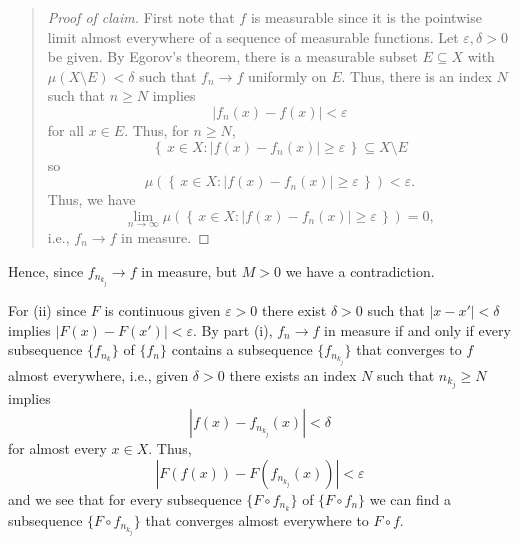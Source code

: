 \begin{solution}
\begin{quote}
\begin{proof}[Proof of claim]
    First note that $f$ is measurable since it is the pointwise limit
    almost everywhere of a sequence of measurable functions. Let
    $\varepsilon,\delta>0$ be given.  By Egorov's theorem,
    there is a measurable subset $E\subseteq X$ with
    $\mu(X\setminus E)<\delta$ such that $f_n\to f$ uniformly on $E$. Thus,
    there is an index $N$ such that $n\geq N$ implies
    \[
      |f_n(x)-f(x)|<\varepsilon
    \]
    for all $x\in E$. Thus, for $n\geq N$,
    \[
      \left\{\,x\in X:|f(x)-f_n(x)|\geq\varepsilon\,\right\}\subseteq
      X\setminus E
    \]
    so
    \[
      \mu\left(%
        \left\{\,x\in X:|f(x)-f_n(x)|\geq\varepsilon\,\right\}%
      \right)%
      <\varepsilon.
    \]
    Thus, we have
    \[
      \lim_{n\to\infty}\mu\left(%
        \left\{\,x\in X:|f(x)-f_n(x)|\geq\varepsilon\,\right\}%
      \right)%
      =0,
    \]
    i.e., $f_n\to f$ in measure.
  \end{proof}
  \end{quote}
  Hence, since $f_{n_{k_j}}\to f$ in measure, but $M>0$ we have a
  contradiction.

  For (ii) since $F$ is continuous given $\varepsilon>0$ there exist
  $\delta>0$ such that $|x-x'|<\delta$ implies
  $|F(x)-F(x')|<\varepsilon$. By part (i), $f_n\to f$ in measure if and
  only if every subsequence $\{f_{n_k}\}$ of $\{f_n\}$ contains a
  subsequence $\{f_{n_{k_j}}\}$ that converges to $f$ almost everywhere,
  i.e., given $\delta>0$ there exists an index $N$ such that $n_{k_j}\geq
  N$ implies
  \[
    |f(x)-f_{n_{k_j}}(x)|<\delta
  \]
  for almost every $x\in X$. Thus,
  \[
    \left|F(f(x))-F(f_{n_{k_j}}(x))\right|<\varepsilon
  \]
  and we see that for every subsequence $\{F\circ f_{n_k}\}$ of $\{F\circ
  f_n\}$ we can find a subsequence $\{F\circ f_{n_{k_j}}\}$ that converges
  almost everywhere to $F\circ f$.
\end{solution}

